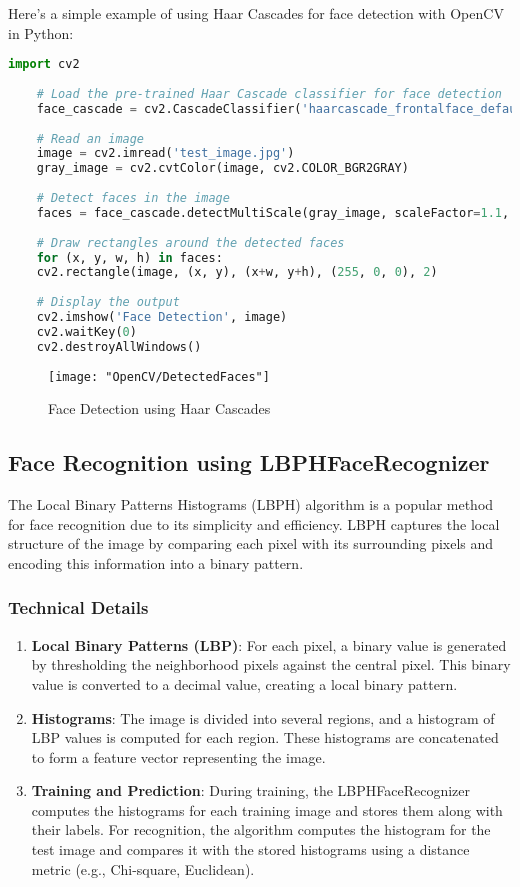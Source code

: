Here's a simple example of using Haar Cascades for face detection with OpenCV in Python:\cite{Jasmcaus:2024}

\begin{lstlisting}[language=Python, caption=Haar Cascade Face Detection]
	import cv2
	
	# Load the pre-trained Haar Cascade classifier for face detection
	face_cascade = cv2.CascadeClassifier('haarcascade_frontalface_default.xml')
	
	# Read an image
	image = cv2.imread('test_image.jpg')
	gray_image = cv2.cvtColor(image, cv2.COLOR_BGR2GRAY)
	
	# Detect faces in the image
	faces = face_cascade.detectMultiScale(gray_image, scaleFactor=1.1, minNeighbors=5, minSize=(30, 30))
	
	# Draw rectangles around the detected faces
	for (x, y, w, h) in faces:
	cv2.rectangle(image, (x, y), (x+w, y+h), (255, 0, 0), 2)
	
	# Display the output
	cv2.imshow('Face Detection', image)
	cv2.waitKey(0)
	cv2.destroyAllWindows()
\end{lstlisting}

\begin{figure}[h]
	\centering
	\texttt{[image: "OpenCV/DetectedFaces"]}
	\caption{Face Detection using Haar Cascades}\label{Face Detection using Haar Cascades}
\end{figure}

\subsection{Face Recognition using LBPHFaceRecognizer}


The Local Binary Patterns Histograms (LBPH) algorithm is a popular method for face recognition due to its simplicity and efficiency. LBPH captures the local structure of the image by comparing each pixel with its surrounding pixels and encoding this information into a binary pattern.

\subsubsection{Technical Details}
\begin{enumerate}
	\item \textbf{Local Binary Patterns (LBP)}: For each pixel, a binary value is generated by thresholding the neighborhood pixels against the central pixel. This binary value is converted to a decimal value, creating a local binary pattern.
	\item \textbf{Histograms}: The image is divided into several regions, and a histogram of LBP values is computed for each region. These histograms are concatenated to form a feature vector representing the image.
	\item \textbf{Training and Prediction}: During training, the LBPHFaceRecognizer computes the histograms for each training image and stores them along with their labels. For recognition, the algorithm computes the histogram for the test image and compares it with the stored histograms using a distance metric (e.g., Chi-square, Euclidean).\cite{viola:2001}
\end{enumerate}



